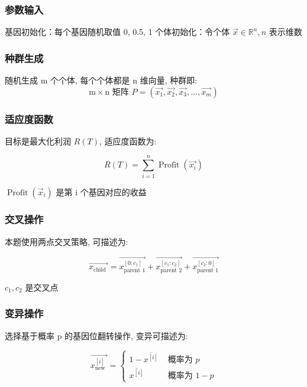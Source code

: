 \documentclass[12pt]{ctexart}
\begin{document}
	\subsubsection{参数输入}
	基因初始化：每个基因随机取值 0, 0.5, 1 个体初始化：令个体 $\vec{x} \in \mathbb{R}^n, n$ 表示维数
	\subsubsection{种群生成}
	随机生成 m 个个体, 每个个体都是 n 维向量, 种群即:
	\begin{equation}
		\text{m} \times \text{n} \text{ 矩阵 } P = \left(\overrightarrow{x_1}, \overrightarrow{x_2}, \overrightarrow{x_3}, \ldots, \overrightarrow{x_m}\right)
	\end{equation}
	\subsubsection{适应度函数}
	目标是最大化利润 $R(T)$, 适应度函数为:
	
	\begin{equation}
	R(T)=\sum_{i=1}^n \operatorname{Profit}\left(\overrightarrow{x_i}\right)
\end{equation}
	
	$\operatorname{Profit}\left(\vec{x}_i\right)$ 是第 i 个基因对应的收益
	\subsubsection{交叉操作}
	本题使用两点交叉策略, 可描述为:
	
	\begin{equation}
	\overrightarrow{x_{\text {child }}}=\overrightarrow{x_{\text {parent } 1}^{\left[0: c_1\right]}}+\overrightarrow{x_{\text {parent } 2}^{\left[c_1: c_2\right]}}+\overrightarrow{x_{\text {parent } 1}^{\left[c_2: 0\right]}}
\end{equation}
	
	$c_1, c_2$ 是交叉点
	\subsubsection{变异操作}
	选择基于概率 p 的基因位翻转操作, 变异可描述为:
	
\begin{equation}
	\overrightarrow{x_{\text {new }}^{[i]}}=\left\{\begin{array}{cc}
		1-\overline{x^{[i]}} & \text { 概率为 } p \\
		\overline{x^{[i]}} & \text { 概率为 } 1-p
	\end{array}\right.
\end{equation}
	
\end{document}
